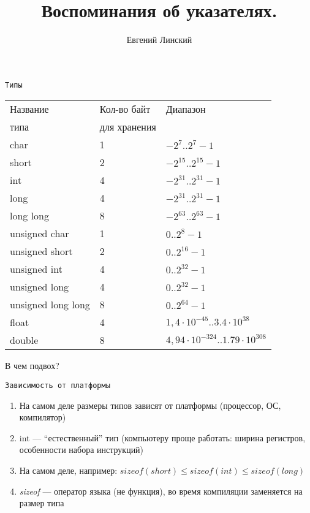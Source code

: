 \documentclass[pdf, 10pt, unicode]{beamer}
\title{Воспоминания об указателях.}
\author{Евгений Линский}
\date{}
\begin{document}
\begin{frame}
  \vspace{1cm}
  \large
  \maketitle
  \thispagestyle{empty}
  \vspace{1cm}
  \date{}
\end{frame}

\begin{frame}[fragile]{{\tt Типы}}

\begin{tabular}{lll}
Название & Кол-во байт & Диапазон \\
типа     & для хранения & \\
\hline
char  & 1 & $-2^{7}..2^{7}-1$ \\
short & 2 & $-2^{15}..2^{15}-1$ \\
int   & 4 & $-2^{31}..2^{31}-1$ \\
long  & 4 & $-2^{31}..2^{31}-1$ \\
long long & 8 & $-2^{63}..2^{63}-1$ \\
unsigned char  & 1 & $0..2^{8}-1$ \\
unsigned short & 2 & $0..2^{16}-1$ \\
unsigned int   & 4 & $0..2^{32}-1$ \\
unsigned long  & 4 & $0..2^{32}-1$ \\
unsigned long long & 8 & $0..2^{64}-1$ \\
\hline
float  & 4 & $1,4 \cdot 10^{-45}.. 3.4 \cdot 10^{38}$ \\
double & 8 & $4,94 \cdot 10^{-324}.. 1.79 \cdot 10^{308}$ \\
\end{tabular}

В чем подвох?
\end{frame}

\begin{frame}[fragile]{{\tt Зависимость от платформы}}
\begin{enumerate}
  \item На самом деле размеры типов зависят от платформы (процессор, ОС, компилятор)
  \item int --- ``естественный'' тип (компьютеру проще работать: ширина регистров, особенности набора инструкций)
  \item На самом деле, например: $ sizeof(short) \leq sizeof(int) \leq sizeof(long) $
  \item \emph{sizeof} --- оператор языка (не функция), во время компиляции заменяется на размер типа
\end{enumerate}
\end{frame}
\end{document}
